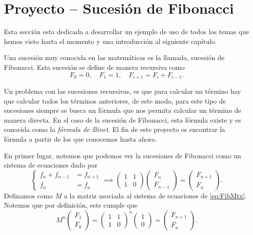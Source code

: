 \section{Proyecto -- Sucesión de Fibonacci}


Esta sección esta dedicada a desarrollar un ejemplo de uso de todos los temas que hemos visto hasta el momento y una introducción al siguiente capítulo.

Una sucesión muy conocida en las matemáticas es la llamada, sucesión de Fibonacci. Esta sucesión se define de manera recursiva como
\[
  F_0 = 0, \quad F_1 = 1, \quad F_{i+1} = F_i + F_{i-1}.
\]

Un problema con las sucesiones recursivas, es que para calcular un término hay que calcular todos los términos anteriores, de este modo, para este tipo de sucesiones siempre se busca un fórmula que nos permita calcular un término de manera directa. En el caso de la sucesión de Fibonacci, esta fórmula existe y es conocida como la \emph{fórmula de Binet}. El fin de este proyecto es encontrar la fórmula a partir de los que conocemos hasta ahora.

En primer lugar, notemos que podemos ver la sucesiones de Fibonacci como un sistema de ecuaciones dado por
\begin{equation}
  \left\{\begin{aligned}
    f_{n} + f_{n-1} &= f_{n+1} \\
    f_n             &= f_n
  \end{aligned}\right. 
    \implies
  \begin{pmatrix}
   1 & 1 \\ 1 & 0
  \end{pmatrix} \begin{pmatrix}  F_n \\ F_{n-1} \end{pmatrix}
    = \begin{pmatrix}  F_{n+1} \\ F_n \end{pmatrix}.
    \label{eq:FibMtx}
\end{equation}
Definamos como $M$ a la matriz asociada al sistema de ecuaciones de \eqref{eq:FibMtx}. Notemos que por definición, este cumple que
\[
  M^n \begin{pmatrix}  F_1 \\ F_0 \end{pmatrix} 
    = \begin{pmatrix} 1 & 1 \\ 1 & 0 \end{pmatrix}^n  \begin{pmatrix}  1 \\ 0 \end{pmatrix}
    = \begin{pmatrix}  F_{n+1} \\ F_n \end{pmatrix}.
\]

